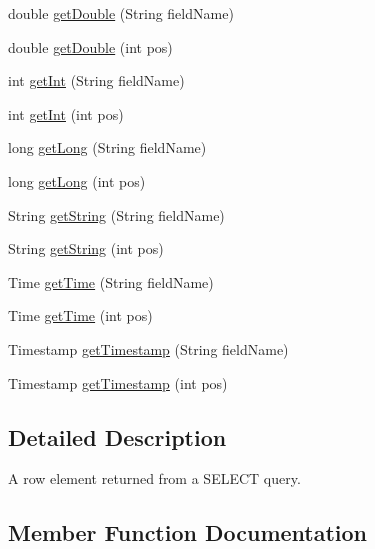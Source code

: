 \begin{DoxyCompactItemize}
\item 
double \mbox{\hyperlink{interfacecom_1_1mysql_1_1cj_1_1xdevapi_1_1_row_aa17f86b07b80d51e90583cce2fdba351}{get\+Double}} (String field\+Name)
\item 
double \mbox{\hyperlink{interfacecom_1_1mysql_1_1cj_1_1xdevapi_1_1_row_a08e5f9ea0d2bf9dfd262d75c59aee6ec}{get\+Double}} (int pos)
\item 
int \mbox{\hyperlink{interfacecom_1_1mysql_1_1cj_1_1xdevapi_1_1_row_a62139a557ddaf76dc42a282f32184af2}{get\+Int}} (String field\+Name)
\item 
int \mbox{\hyperlink{interfacecom_1_1mysql_1_1cj_1_1xdevapi_1_1_row_a2a2d2a39eed96b8f879fc2f8873b3cb9}{get\+Int}} (int pos)
\item 
long \mbox{\hyperlink{interfacecom_1_1mysql_1_1cj_1_1xdevapi_1_1_row_a8bd4e08495b03dc8c25bd4d39c82c9dd}{get\+Long}} (String field\+Name)
\item 
long \mbox{\hyperlink{interfacecom_1_1mysql_1_1cj_1_1xdevapi_1_1_row_a3c05d4e3c6f11dea6c023d046f645a46}{get\+Long}} (int pos)
\item 
String \mbox{\hyperlink{interfacecom_1_1mysql_1_1cj_1_1xdevapi_1_1_row_ad6611c8fb8933ac81f42d6b74ce55a4d}{get\+String}} (String field\+Name)
\item 
String \mbox{\hyperlink{interfacecom_1_1mysql_1_1cj_1_1xdevapi_1_1_row_a9541aea8429441708b11c5e46f07daec}{get\+String}} (int pos)
\item 
Time \mbox{\hyperlink{interfacecom_1_1mysql_1_1cj_1_1xdevapi_1_1_row_aafc98ec7296e3b5746e4cd3c994312e3}{get\+Time}} (String field\+Name)
\item 
Time \mbox{\hyperlink{interfacecom_1_1mysql_1_1cj_1_1xdevapi_1_1_row_af8539bd76fe29bcae08571b10d0d2fe8}{get\+Time}} (int pos)
\item 
Timestamp \mbox{\hyperlink{interfacecom_1_1mysql_1_1cj_1_1xdevapi_1_1_row_a5c5927af31f8f19fddb88925ab91d15b}{get\+Timestamp}} (String field\+Name)
\item 
Timestamp \mbox{\hyperlink{interfacecom_1_1mysql_1_1cj_1_1xdevapi_1_1_row_a1787ae5b42c08a8a446d7ff7e6f8bd4e}{get\+Timestamp}} (int pos)
\end{DoxyCompactItemize}


\subsection{Detailed Description}
A row element returned from a S\+E\+L\+E\+CT query. 

\subsection{Member Function Documentation}
\mbox{\label{interfacecom_1_1mysql_1_1cj_1_1xdevapi_1_1_row_a9156481badcdd629901b26f56e85aa3b}} 

